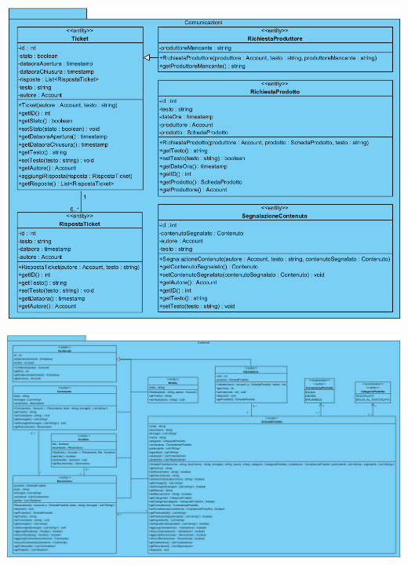 \begin{center}
			\includegraphics[width=\textwidth]{assets/visualParadigm/classi/Comunicazioni}
\end{center}

\begin{landscape}
\begin{center}
			\includegraphics[width=\linewidth]{assets/visualParadigm/classi/Contenuti}
\end{center}
\end{landscape}
	
